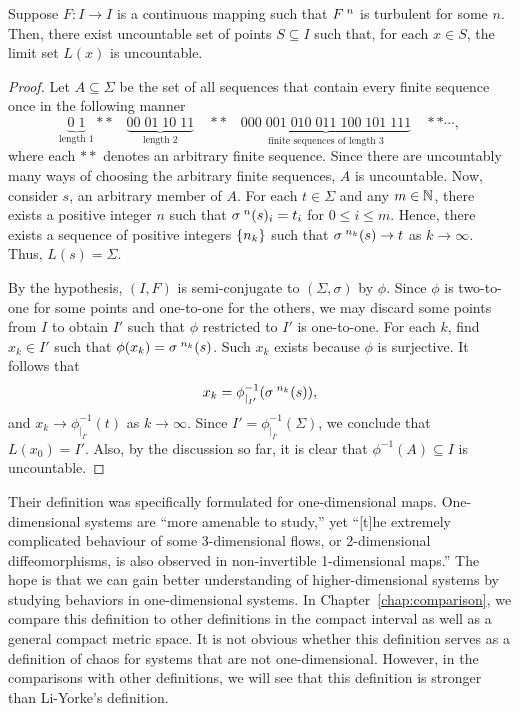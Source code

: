 \documentclass[10pt,twoside]{book}
\begin{document}
\begin{proposition}
  Suppose $F: I \to I$ is a continuous mapping such that $F^{\;n}$ is turbulent for some $n$.
  Then, there exist uncountable set of points $S \subseteq I$ such that, for each $x \in S$, the limit set $L(x)$ is uncountable.
  \begin{proof}
    Let $A \subseteq \Sigma$ be the set of all sequences that contain every finite sequence once in the following manner
    \begin{equation*}
      \underbrace{0\; 1}_{\mbox{length 1}} **\quad \underbrace{00\; 01\; 10\; 11}_{\mbox{length 2}} \quad**\quad \underbrace{000\; 001\; 010\; 011\; 100\; 101\; 111}_{\mbox{finite sequences of length 3}} \quad** \cdots,
    \end{equation*}
    where each $**$ denotes an arbitrary finite sequence.
    Since there are uncountably many ways of choosing the arbitrary finite sequences, $A$ is uncountable.
    Now, consider $s$, an arbitrary member of $A$.
    For each $t \in \Sigma$ and any $m \in \mathbb{N}$, there exists a positive integer $n$ such that $\sigma^{\;n}(s)_i = t_i$ for $0 \leq i \leq m$.
    Hence, there exists a sequence of positive integers $\left \{ n_k \right \}$ such that $\sigma^{\;n_k}(s) \to t$ as $k \to \infty$.
    Thus, $L(s) = \Sigma$.

    By the hypothesis, $(I, F)$ is semi-conjugate to $(\Sigma, \sigma)$ by $\phi$.
    Since $\phi$ is two-to-one for some points and one-to-one for the others, we may discard some points from $I$ to obtain $I'$ such that $\phi$ restricted to $I'$ is one-to-one.
    For each $k$, find $x_k \in I'$ such that $\phi(x_k) = \sigma^{\;n_k}(s)$.
    Such $x_k$ exists because $\phi$ is surjective.
    It follows that
    \begin{equation*}
      x_k = \phi_{|_{I'}}^{-1}(\sigma^{\;n_k}(s)),
    \end{equation*}
    and $x_k \to \phi_{|_{I'}}^{-1}(t)$ as $k \to \infty$.
    Since $I' = \phi_{|_{I'}}^{-1}(\Sigma)$, we conclude that $L(x_0) = I'$.
    Also, by the discussion so far, it is clear that $\phi^{-1}(A) \subseteq I$ is uncountable.
  \end{proof}
\end{proposition}
Their definition was specifically formulated for one-dimensional maps.
One-dimensional systems are ``more amenable to study,'' yet ``[t]he extremely complicated behaviour of some 3-dimensional flows, or 2-dimensional diffeomorphisms, is also observed in non-invertible 1-dimensional maps.''
The hope is that we can gain better understanding of higher-dimensional systems by studying behaviors in one-dimensional systems.
In Chapter~\ref{chap:comparison}, we compare this definition to other definitions in the compact interval as well as a general compact metric space.
It is not obvious whether this definition serves as a definition of chaos for systems that are not one-dimensional.
However, in the comparisons with other definitions, we will see that this definition is stronger than Li-Yorke's definition.
\end{document}
